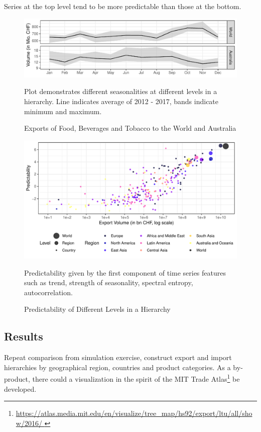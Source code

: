 \documentclass[a4paper,fleqn,11pt]{article}
\begin{document}
Series at the top level tend to be more predictable than those at the bottom.

\begin{figure}[H]
	\includegraphics[width=\textwidth]{fig/fig_season}
	\caption{Exports of Food, Beverages and Tobacco to the World and Australia}
	\footnotesize{Plot demonstrates different seasonalities at different levels in a hierarchy. Line indicates average of 2012 - 2017, bands indicate minimum and maximum.}
\end{figure}

\begin{figure}[H]
	\includegraphics[width=\textwidth]{fig/fig_confetti}
	\caption{Predictability of Different Levels in a Hierarchy}
	\footnotesize{Predictability given by the first component of time series features such as trend, strength of seasonality, spectral entropy, autocorrelation.}
\end{figure}


\subsection{Results}
Repeat comparison from simulation exercise, construct export and import hierarchies by geographical region, countries and product categories. As a by-product, there could a visualization in the spirit of the MIT Trade Atlas\footnote{\url{https://atlas.media.mit.edu/en/visualize/tree_map/hs92/export/ltu/all/show/2016/ }} be developed.\\
\end{document}
